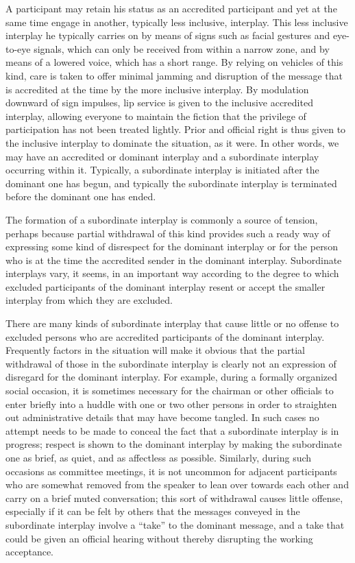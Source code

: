 \documentclass[openany,nobib]{tufte-book}
\begin{document}
A participant may retain his status as an accredited participant and yet
at the same time engage in another, typically less inclusive, interplay.
This less inclusive interplay he typically carries on by means of signs
such as facial gestures and eye-to-eye signals, which can only be
received from within a narrow zone, and by means of a lowered voice,
which has a short range. By relying on vehicles of this kind, care is
taken to offer minimal jamming and disruption of the message that is
accredited at the time by the more inclusive interplay. By modulation
downward of sign impulses, lip service is given to the inclusive
accredited interplay, allowing everyone to maintain the fiction that the
privilege of participation has not been treated lightly. Prior and
official right is thus given to the inclusive interplay to dominate the
situation, as it were. In other words, we may have an accredited or
dominant interplay and a subordinate interplay occurring within it.
Typically, a subordinate interplay is initiated after the dominant one
has begun, and typically the subordinate interplay is terminated before
the dominant one has ended.

The formation of a subordinate interplay is commonly a source of
tension, perhaps because partial withdrawal of this kind provides such a
ready way of expressing some kind of disrespect for the dominant
interplay or for the person who is at the time the accredited sender in
the dominant interplay. Subordinate interplays vary, it seems, in an
important way according to the degree to which excluded participants of
the dominant interplay resent or accept the smaller interplay from which
they are excluded.

There are many kinds of subordinate interplay that cause little or no
offense to excluded persons who are accredited participants of the
dominant interplay. Frequently factors in the situation will make it
obvious that the partial withdrawal of those in the subordinate
interplay is clearly not an expression of disregard for the dominant
interplay. For example, during a formally organized social occasion, it
is sometimes necessary for the chairman or other officials to enter
briefly into a huddle with one or two other persons in order to
straighten out administrative details that may have become tangled. In
such cases no attempt needs to be made to conceal the fact that a
subordinate interplay is in progress; respect is shown to the dominant
interplay by making the subordinate one as brief, as quiet, and as
affectless as possible. Similarly, during such occasions as committee
meetings, it is not uncommon for adjacent participants who are somewhat
removed from the speaker to lean over towards each other and carry on a
brief muted conversation; this sort of withdrawal causes little offense,
especially if it can be felt by others that the messages conveyed in the
subordinate interplay involve a ``take'' to the dominant message, and a
take that could be given an official hearing without thereby disrupting
the working acceptance.
\end{document}
